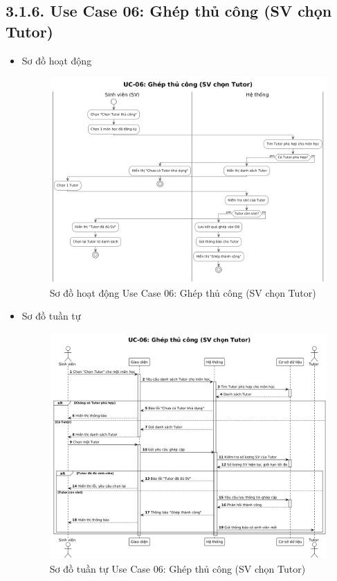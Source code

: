 \subsection*{3.1.6. Use Case 06: Ghép thủ công (SV chọn Tutor)}
\begin{itemize}
    \item Sơ đồ hoạt động
    \begin{figure}[H]
    \centering
    \includegraphics[scale=0.35 ]{Picture/ACUC06.png}
    \caption{Sơ đồ hoạt động Use Case 06: Ghép thủ công (SV chọn Tutor)}
    \end{figure}
    \item Sơ đồ tuần tự
    \begin{figure}[H]
    \centering
    \includegraphics[scale=0.35 ]{Picture/SEUC06.png}
    \caption{Sơ đồ tuần tự Use Case 06: Ghép thủ công (SV chọn Tutor)}
    \end{figure}
\end{itemize}
